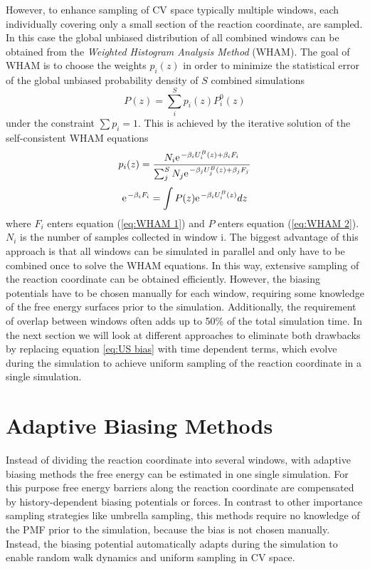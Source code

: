 However, to enhance sampling of CV space typically multiple windows, each individually covering only a small section of the reaction coordinate, are sampled. In this case the global unbiased distribution of all combined windows can be obtained from the \textit{Weighted Histogram Analysis Method} (WHAM).\autocite{souaille2001extension} The goal of WHAM is to choose the weights $p_i(z)$ in order to minimize the statistical error of the global unbiased probability density of $S$ combined simulations
\begin{equation}
  P(z)=\sum_i^{S} p_i(z) P_i^0(z)
\end{equation}
under the constraint $\sum p_i = 1$. This is achieved by the iterative solution of the self-consistent WHAM equations
\begin{equation}
  p_i(z) = \frac{N_i \e^{-\beta_i U_i^B(z)+\beta_i F_i}}{\sum_j^S N_j \e^{-\beta_j U_j^B(z)+\beta_j F_j}} \label{eq:WHAM 1}
\end{equation}
\begin{equation}
  \e^{-\beta_i F_i} = \int P(z)\e^{-\beta_i U_i^B (z)}dz
  \label{eq:WHAM 2}
\end{equation}
where $F_i$ enters equation (\ref{eq:WHAM 1}) and $P$ enters equation (\ref{eq:WHAM 2}).\autocite{kastner2011umbrella,souaille2001extension} $N_i$ is the number of samples collected in window i.
The biggest advantage of this approach is that all windows can be simulated in parallel and only have to be combined once to solve the WHAM equations. In this way, extensive sampling of the reaction coordinate can be obtained efficiently.
However, the biasing potentials have to be chosen manually for each window, requiring some knowledge of the free energy surfaces prior to the simulation.
Additionally, the requirement of overlap between windows often adds up to 50\% of the total simulation time.\autocite{comer2015adaptive}
In the next section we will look at different approaches to eliminate both drawbacks by replacing equation \ref{eq:US bias} with time dependent terms, which evolve during the simulation to achieve uniform sampling of the reaction coordinate in a single simulation.

\newpage
\section{Adaptive Biasing Methods}
\label{sec:adaptive biasing}

Instead of dividing the reaction coordinate into several windows, with adaptive biasing methods the free energy can be estimated in one single simulation. For this purpose free energy barriers along the reaction coordinate are compensated by history-dependent biasing potentials or forces. In contrast to other importance sampling strategies like umbrella sampling, this methods require no knowledge of the PMF prior to the simulation, because the bias is not chosen manually. Instead, the biasing potential automatically adapts during the simulation to enable random walk dynamics and uniform sampling in CV space.\autocite{comer2015adaptive, barducci2011metadynamics}

